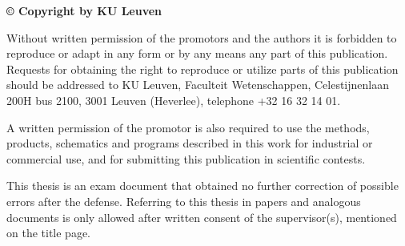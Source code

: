 \mbox{}
\thispagestyle{empty}
\vfill
\noindent \textbf{© Copyright by KU Leuven}
\par\bigskip
\noindent Without written permission of the promotors and the authors it is forbidden to reproduce or adapt in any form or by
any means any part of this publication. Requests for obtaining the right to reproduce or utilize parts of this publication should be addressed to KU Leuven, Faculteit Wetenschappen, Celestijnenlaan 200H bus 2100, 3001 Leuven
(Heverlee), telephone +32 16 32 14 01.
\par\bigskip
\noindent A written permission of the promotor is also required to use the methods, products, schematics and programs
described in this work for industrial or commercial use, and for submitting this publication in scientific contests.
\par\bigskip
\noindent This thesis is an exam document that obtained no further correction of possible errors after the defense. Referring to this thesis in papers and analogous documents is only allowed after written consent of the supervisor(s), mentioned on the title page.